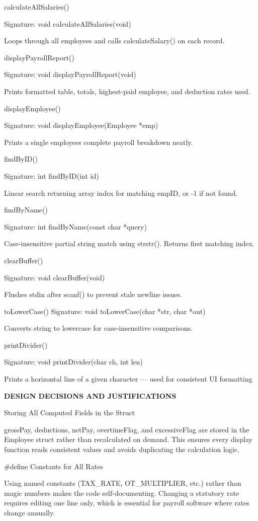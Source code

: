 \documentclass[
]{article}
\begin{document}
calculateAllSalaries()

Signature: void calculateAllSalaries(void)

Loops through all employees and calls calculateSalary() on each record.

displayPayrollReport()

Signature: void displayPayrollReport(void)

Prints formatted table, totals, highest-paid employee, and deduction
rates used.

displayEmployee()

Signature: void displayEmployee(Employee *emp)

Prints a single employee\textquotesingle s complete payroll breakdown
neatly.

findByID()

Signature: int findByID(int id)

Linear search returning array index for matching empID, or -1 if not
found.

findByName()

Signature: int findByName(const char *query)

Case-insensitive partial string match using strstr(). Returns first
matching index.

clearBuffer()

Signature: void clearBuffer(void)

Flushes stdin after scanf() to prevent stale newline issues.

toLowerCase() Signature: void toLowerCase(char *str, char *out)

Converts string to lowercase for case-insensitive comparisons.

printDivider()

Signature: void printDivider(char ch, int len)

Prints a horizontal line of a given character --- used for consistent UI
formatting

\textbf{DESIGN DECISIONS AND JUSTIFICATIONS}

Storing All Computed Fields in the Struct

grossPay, deductions, netPay, overtimeFlag, and excessiveFlag are stored
in the Employee struct rather than recalculated on demand. This ensures
every display function reads consistent values and avoids duplicating
the calculation logic.

\#define Constants for All Rates

Using named constants (TAX\_RATE, OT\_MULTIPLIER, etc.) rather than
magic numbers makes the code self-documenting. Changing a statutory rate
requires editing one line only, which is essential for payroll software
where rates change annually.
\end{document}
